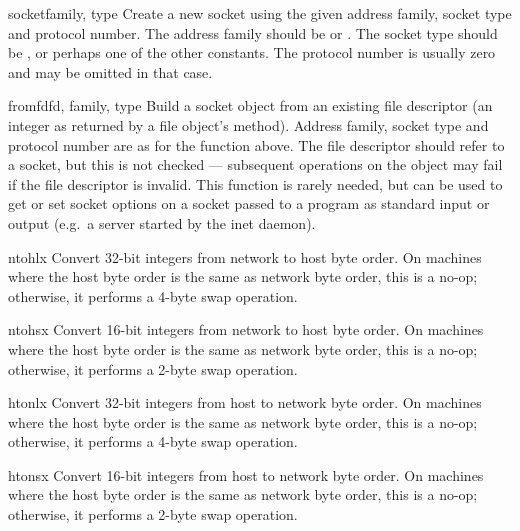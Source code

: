 \begin{funcdesc}{socket}{family, type}
Create a new socket using the given address family, socket type and
protocol number.  The address family should be  or
.  The socket type should be ,
 or perhaps one of the other  constants.
The protocol number is usually zero and may be omitted in that case.
\end{funcdesc}

\begin{funcdesc}{fromfd}{fd, family, type}
Build a socket object from an existing file descriptor (an integer as
returned by a file object's  method).  Address family,
socket type and protocol number are as for the  function
above.  The file descriptor should refer to a socket, but this is not
checked --- subsequent operations on the object may fail if the file
descriptor is invalid.  This function is rarely needed, but can be
used to get or set socket options on a socket passed to a program as
standard input or output (e.g.\ a server started by the \UNIX{} inet
daemon).
\end{funcdesc}

\begin{funcdesc}{ntohl}{x}
Convert 32-bit integers from network to host byte order.  On machines
where the host byte order is the same as network byte order, this is a
no-op; otherwise, it performs a 4-byte swap operation.
\end{funcdesc}

\begin{funcdesc}{ntohs}{x}
Convert 16-bit integers from network to host byte order.  On machines
where the host byte order is the same as network byte order, this is a
no-op; otherwise, it performs a 2-byte swap operation.
\end{funcdesc}

\begin{funcdesc}{htonl}{x}
Convert 32-bit integers from host to network byte order.  On machines
where the host byte order is the same as network byte order, this is a
no-op; otherwise, it performs a 4-byte swap operation.
\end{funcdesc}

\begin{funcdesc}{htons}{x}
Convert 16-bit integers from host to network byte order.  On machines
where the host byte order is the same as network byte order, this is a
no-op; otherwise, it performs a 2-byte swap operation.
\end{funcdesc}

